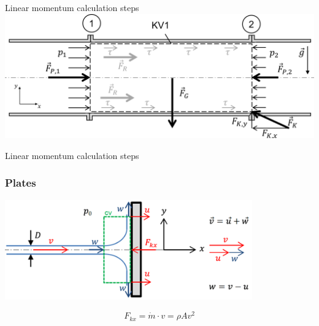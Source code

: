 \documentclass{article}
\begin{document}
\begin{multicols}{2}
\begin{examplebox}{Linear momentum calculation steps}
    \includegraphics[width=\textwidth]{media/CV1.png}
\end{examplebox}
\vfill
\end{multicols}

\newpage
\begin{multicols}{2}
\setlength{\columnsep}{1pt}
\begin{examplebox}{Linear momentum calculation steps}
    \subsubsection{Plates}
    \begin{center}
        \includegraphics[width=0.8\textwidth]{media/platte_bewegt.png}
    \end{center}
    \begin{equation}
        F_{kx} = \dot{m}\cdot v = \rho A v^2
    \end{equation}
\end{examplebox}


\end{multicols}
\end{document}
